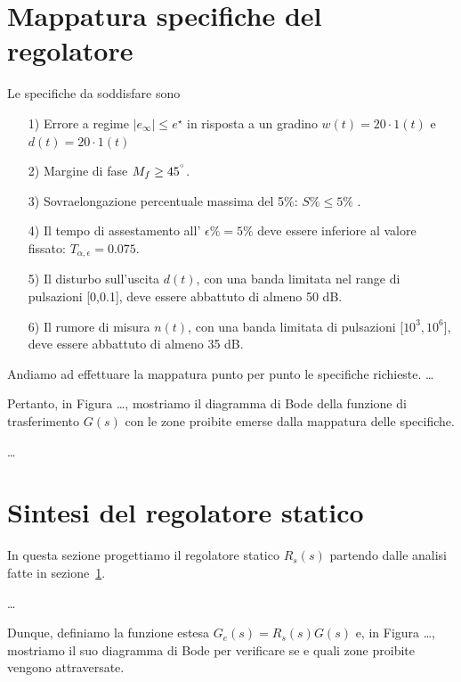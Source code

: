 \documentclass[a4paper, 11pt]{article}
\begin{document}
\section{Mappatura specifiche del regolatore}
\label{sec:specifications}

Le specifiche da soddisfare sono
\begin{itemize}
	\item[1)] Errore a regime $|e_{\infty}| \leq e^{\star}$ in risposta a un gradino $w(t) = 20 \cdot 
 1(t) $ e $d(t)= 20 \cdot 1(t)$ \\
	\item[2)] Margine di fase $M_f \geq 45^{\degree}$.\\
    \item[3)] Sovraelongazione percentuale massima del 5\%: $S \% \leq 5\% $ .\\
    \item[4)] Il tempo di assestamento all' $\epsilon \% = 5 \% $ deve essere inferiore al valore fissato: $T_{\alpha, \epsilon} = 0.075$.\\
	\item[5)] Il disturbo sull'uscita $d(t)$, con una banda limitata nel range di pulsazioni [0,0.1], deve essere abbattuto di almeno 50 dB.\\
	\item[6)] Il rumore di misura $n(t)$, con una banda limitata di pulsazioni [$10^3, 10^6$], deve essere abbattuto di almeno 35 dB.
\end{itemize}
%
Andiamo ad effettuare la mappatura punto per punto le specifiche richieste. \dots  

Pertanto, in Figura \dots, mostriamo il diagramma di Bode della funzione di trasferimento $G(s)$ con le zone proibite emerse dalla mappatura delle specifiche.

\dots

\section{Sintesi del regolatore statico}
\label{sec:static_regulator}

In questa sezione progettiamo il regolatore statico $R_s(s)$ partendo dalle analisi fatte in sezione~\ref{sec:specifications}.

\dots

Dunque, definiamo la funzione estesa $G_e(s) = R_s(s)G(s)$ e, in Figura \dots, mostriamo il suo diagramma di Bode per verificare se e quali zone proibite vengono attraversate.
\end{document}
